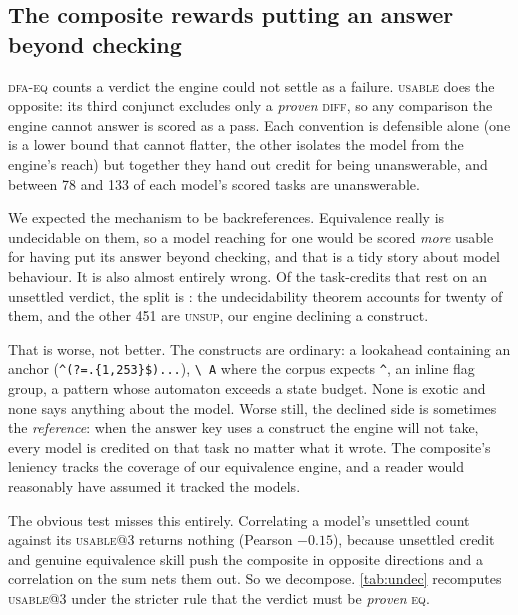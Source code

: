 \documentclass[11pt]{article}
\newcommand{\usable}{\textsc{usable}}
\newcommand{\dfaeq}{\textsc{dfa-eq}}
\begin{document}
\subsection{The composite rewards putting an answer beyond checking}
\label{sec:undec}

\dfaeq{} counts a verdict the engine could not settle as a failure. \usable{}
does the opposite: its third conjunct excludes only a \emph{proven}
\textsc{diff}, so any comparison the engine cannot answer is scored as a pass.
Each convention is defensible alone (one is a lower bound that cannot
flatter, the other isolates the model from the engine's reach) but together
they hand out credit for being unanswerable, and between 78 and 133 of each
model's scored tasks are unanswerable.

We expected the mechanism to be backreferences. Equivalence really is
undecidable on them, so a model reaching for one would be scored \emph{more}
usable for having put its answer beyond checking, and that is a tidy story
about model behaviour. It is also almost entirely wrong. Of the
\undecsupported{} task-credits that rest on an unsettled verdict, the split is
\undecsplit{}: the undecidability theorem accounts for twenty of them, and the
other 451 are \textsc{unsup}, our engine declining a construct.

That is worse, not better. The constructs are ordinary: a lookahead
containing an anchor (\lstinline!^(?=.{1,253}$)...!), \texttt{\textbackslash
A} where the corpus expects \texttt{\^{}}, an inline flag group, a pattern
whose automaton exceeds a state budget. None is exotic and none says anything
about the model. Worse still, the declined side is sometimes the
\emph{reference}: when the answer key uses a construct the engine will not
take, every model is credited on that task no matter what it wrote. The
composite's leniency tracks the coverage of our equivalence engine, and a
reader would reasonably have assumed it tracked the models.

The obvious test misses this entirely. Correlating a model's unsettled count
against its \usable{}@3 returns nothing (Pearson $-0.15$), because
unsettled credit and genuine equivalence skill push the composite in opposite
directions and a correlation on the sum nets them out. So we decompose.
\cref{tab:undec} recomputes \usable{}@3 under the stricter rule that the
verdict must be \emph{proven} \textsc{eq}.

\begin{table}[htbp]
\centering
\small

\caption{What the unsettled-verdict convention is worth. ``Proven-\textsc{eq}
only'' requires a demonstrated equivalence rather than the absence of a
demonstrated difference; the final columns are the tasks that separate the
two. Denominators are \cref{tab:main}'s, so the two tables agree.}
\label{tab:undec}
\end{table}
\end{document}
